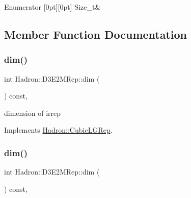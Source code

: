 \begin{DoxyEnumFields}{Enumerator}
[0pt][0pt]{}\mbox{\label{structHadron_1_1D3E2MRep_acf3401203fd4135293119172cfcffa44a2044360bbc5b9f2b2fc5357007fc1e88}} 
Size\+\_\+t&\\
\hline

\end{DoxyEnumFields}


\subsection{Member Function Documentation}
\mbox{\label{structHadron_1_1D3E2MRep_a73c88cd77967138738e5b0bcdda21ab9}} 
\subsubsection{\texorpdfstring{dim()}{dim()}\hspace{0.1cm}{\footnotesize\ttfamily [1/3]}}
{\footnotesize\ttfamily int Hadron\+::\+D3\+E2\+M\+Rep\+::dim (\begin{DoxyParamCaption}{ }\end{DoxyParamCaption}) const\hspace{0.3cm}{\ttfamily [inline]}, {\ttfamily [virtual]}}

dimension of irrep 

Implements \mbox{\hyperlink{structHadron_1_1CubicLGRep_a3acbaea26503ed64f20df693a48e4cdd}{Hadron\+::\+Cubic\+L\+G\+Rep}}.

\mbox{\label{structHadron_1_1D3E2MRep_a73c88cd77967138738e5b0bcdda21ab9}} 
\subsubsection{\texorpdfstring{dim()}{dim()}\hspace{0.1cm}{\footnotesize\ttfamily [2/3]}}
{\footnotesize\ttfamily int Hadron\+::\+D3\+E2\+M\+Rep\+::dim (\begin{DoxyParamCaption}{ }\end{DoxyParamCaption}) const\hspace{0.3cm}{\ttfamily [inline]}, {\ttfamily [virtual]}}

